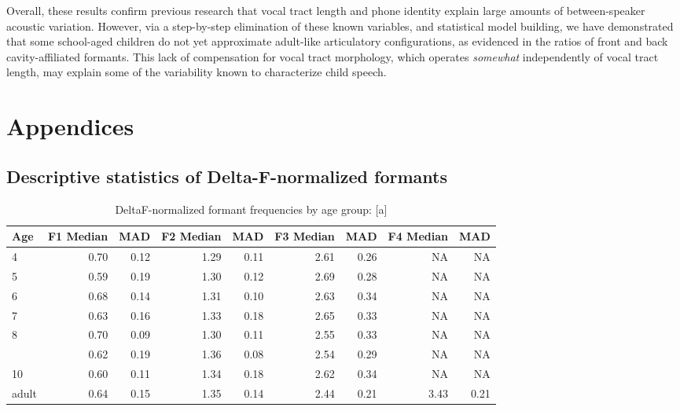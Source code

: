 \documentclass[
]{article}
\begin{document}
Overall, these results confirm previous research that vocal tract length and phone identity explain large amounts of between-speaker acoustic variation. However, via a step-by-step elimination of these known variables, and statistical model building, we have demonstrated that some school-aged children do not yet approximate adult-like articulatory configurations, as evidenced in the ratios of front and back cavity-affiliated formants. This lack of compensation for vocal tract morphology, which operates \emph{somewhat} independently of vocal tract length, may explain some of the variability known to characterize child speech.

\hypertarget{appendices}{%
\section{Appendices}\label{appendices}}

\hypertarget{descriptive-statistics-of-delta-f-normalized-formants}{%
\subsection{Descriptive statistics of Delta-F-normalized formants}\label{descriptive-statistics-of-delta-f-normalized-formants}}

\begin{table}[!h]

\caption{\label{tab:deltaf-measurement-table-a}DeltaF-normalized formant frequencies by age group: [a]}
\centering
\begin{tabular}[t]{lrrrrrrrr}
\toprule
Age & F1 Median & MAD & F2 Median & MAD & F3 Median & MAD & F4 Median & MAD\\
\midrule
4 & 0.70 & 0.12 & 1.29 & 0.11 & 2.61 & 0.26 & NA & NA\\
5 & 0.59 & 0.19 & 1.30 & 0.12 & 2.69 & 0.28 & NA & NA\\
6 & 0.68 & 0.14 & 1.31 & 0.10 & 2.63 & 0.34 & NA & NA\\
7 & 0.63 & 0.16 & 1.33 & 0.18 & 2.65 & 0.33 & NA & NA\\
8 & 0.70 & 0.09 & 1.30 & 0.11 & 2.55 & 0.33 & NA & NA\\
\addlinespace
9 & 0.62 & 0.19 & 1.36 & 0.08 & 2.54 & 0.29 & NA & NA\\
10 & 0.60 & 0.11 & 1.34 & 0.18 & 2.62 & 0.34 & NA & NA\\
adult & 0.64 & 0.15 & 1.35 & 0.14 & 2.44 & 0.21 & 3.43 & 0.21\\
\bottomrule
\end{tabular}
\end{table}
\end{document}
